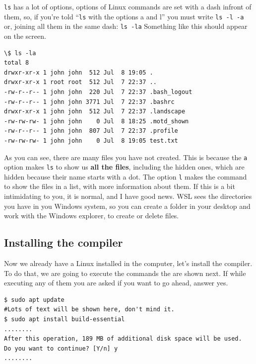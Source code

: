 \documentclass[a4paper]{article}
\begin{document}
\verb!ls! has a lot of options, options of Linux commands are set with a dash
infront of them, so, if you're told ``\verb!ls! with the options a and l'' you
must write \verb!ls -l -a! or, joining all them in the same dash: \verb!ls -la!
Something like this should appear on the screen.

\noindent
\begin{minipage}[H]{\linewidth}
\mbox{}
\begin{lstlisting}[style=terminalStyle]
\$ ls -la
total 8
drwxr-xr-x 1 john john  512 Jul  8 19:05 .
drwxr-xr-x 1 root root  512 Jul  7 22:37 ..
-rw-r--r-- 1 john john  220 Jul  7 22:37 .bash_logout
-rw-r--r-- 1 john john 3771 Jul  7 22:37 .bashrc
drwxr-xr-x 1 john john  512 Jul  7 22:37 .landscape
-rw-rw-rw- 1 john john    0 Jul  8 18:25 .motd_shown
-rw-r--r-- 1 john john  807 Jul  7 22:37 .profile
-rw-rw-rw- 1 john john    0 Jul  8 19:05 test.txt
\end{lstlisting}
\end{minipage}

As you can see, there are many files you have not created. This is because the
\verb!a! option makes \verb!ls! to show us \textbf{all the files}, including the
hidden ones, which are hidden because their name starts with a dot. The option
\verb!l! makes the command to show the files in a list, with more information
about them. If this is a bit intimidating to you, it is normal, and I have good
news. WSL sees the directories you have in you Windows system, so you can create
a folder in your desktop and work with the Windows explorer, to create or delete
files.

\subsection{Installing the compiler}
Now we already have a Linux installed in the computer, let's install the
compiler. To do that, we are going to execute the commands the are shown next.
If while executing any of them you are asked if you want to go ahead, answer
yes.

\noindent
\begin{minipage}[H]{\linewidth}
\mbox{}
\begin{lstlisting}[style=terminalStyle]
$ sudo apt update
#Lots of text will be shown here, don't mind it.
$ sudo apt install build-essential
........
After this operation, 189 MB of additional disk space will be used.
Do you want to continue? [Y/n] y
........
\end{lstlisting}
\end{minipage}
\end{document}
